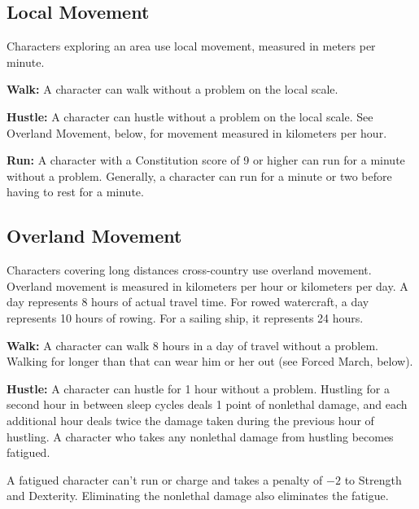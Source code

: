 

\subsection{Local Movement}
Characters exploring an area use local movement, measured in meters per minute.

\textbf{Walk:} A character can walk without a problem on the local scale.

\textbf{Hustle:} A character can hustle without a problem on the local scale. See Overland Movement, below, for movement measured in kilometers per hour.

\textbf{Run:} A character with a Constitution score of 9 or higher can run for a minute without a problem. Generally, a character can run for a minute or two before having to rest for a minute.

\subsection{Overland Movement}
Characters covering long distances cross-country use overland movement. Overland movement is measured in kilometers per hour or kilometers per day. A day represents 8 hours of actual travel time. For rowed watercraft, a day represents 10 hours of rowing. For a sailing ship, it represents 24 hours.

\textbf{Walk:} A character can walk 8 hours in a day of travel without a problem. Walking for longer than that can wear him or her out (see Forced March, below).

\textbf{Hustle:} A character can hustle for 1 hour without a problem. Hustling for a second hour in between sleep cycles deals 1 point of nonlethal damage, and each additional hour deals twice the damage taken during the previous hour of hustling. A character who takes any nonlethal damage from hustling becomes fatigued.

A fatigued character can't run or charge and takes a penalty of $-2$ to Strength and Dexterity. Eliminating the nonlethal damage also eliminates the fatigue.

